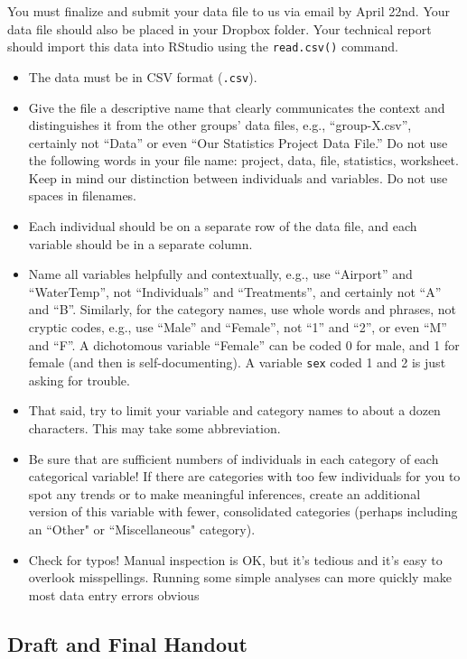 \documentclass[10pt]{article}
\begin{document}
You must finalize and submit your data file to us via email by April 22nd. Your data file should also be placed in your Dropbox folder. Your technical report should import this data into RStudio using the \texttt{read.csv()} command. 

\begin{itemize}
	\item The data must be in CSV format (\texttt{.csv}).
	\item Give the file a descriptive name that clearly communicates the context and distinguishes it from the other groups' data files, e.g., “group-X.csv”, certainly not “Data” or even “Our Statistics Project Data File.”  Do not use the following words in your file name: project, data, file, statistics, worksheet.  
Keep in mind our distinction between individuals and variables. Do not use spaces in filenames.
	\item Each individual should be on a separate row of the data file, and each variable should be in a separate column.
	\item Name all variables helpfully and contextually, e.g., use “Airport” and “WaterTemp”, not “Individuals” and “Treatments”, and certainly not “A” and “B”.
Similarly, for the category names, use whole words and phrases, not cryptic codes, e.g., use “Male” and “Female”, not “1” and “2”, or even “M” and “F”.  A dichotomous variable “Female” can be coded 0 for male, and 1 for female (and then is self-documenting). A variable {\tt sex} coded 1 and 2 is just asking for trouble.
	\item That said, try to limit your variable and category names to about a dozen characters.  This may take some abbreviation.
	\item Be sure that are sufficient numbers of individuals in each category of each categorical variable!  If there are categories with too few individuals for you to spot any trends or to make meaningful inferences, create an additional version of this variable with fewer, consolidated categories (perhaps including an ``Other" or ``Miscellaneous" category).
	\item Check for typos!  Manual inspection is OK, but it’s tedious and it’s easy to overlook misspellings.  Running some simple analyses can more quickly make most data entry errors obvious
\end{itemize}

\subsection{Draft and Final Handout}
\end{document}
